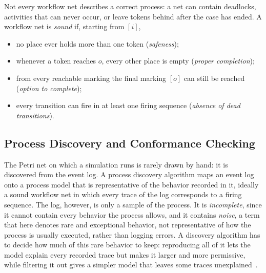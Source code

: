     Not every workflow net describes a correct process: a net can contain
    deadlocks, activities that can never occur, or leave tokens behind after the
    case has ended. A workflow net is \emph{sound} if, starting from $[i]$,
    \begin{itemize}
      \item no place ever holds more than one token (\emph{safeness});
      \item whenever a token reaches $o$, every other place is empty
            (\emph{proper completion});
      \item from every reachable marking the final marking $[o]$ can still be
            reached (\emph{option to complete});
      \item every transition can fire in at least one firing sequence
            (\emph{absence of dead transitions}).
    \end{itemize}

    \subsection{Process Discovery and Conformance Checking}
    \label{subsec:bg:simulation:pdisc}
    The Petri net on which a simulation runs is rarely drawn by hand: it is
    discovered from the event log. A process discovery algorithm maps an event log
    onto a process model that is representative of the behavior recorded in it,
    ideally a sound workflow net in which every trace of the log corresponds to a
    firing sequence. The log, however, is only a sample of
    the process. It is \emph{incomplete}, since it cannot contain every behavior
    the process allows, and it contains \emph{noise}, a term that here denotes
    rare and exceptional behavior, not representative of how the process is
    usually executed, rather than logging errors. A discovery algorithm has to
    decide how much of this rare behavior to keep: reproducing all of it lets
    the model explain every recorded trace but makes it larger and more
    permissive, while filtering it out gives a simpler model that leaves some
    traces unexplained~\cite{vanderaalst2016}.
    
